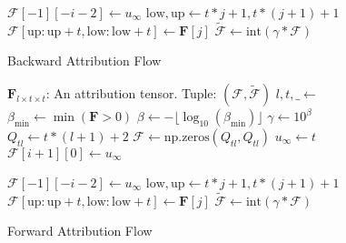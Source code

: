 \documentclass{article} %
\theoremstyle{bfnote}
\newcommand{\adddetail}[2]{\todo[inline, inlinewidth=5cm, author=#2, color=lightpurple]{#1}}
\begin{document}
\begin{figure}[!htbp]
\begin{minipage}{0.45\textwidth}
\begin{algorithm}[H]
\begin{algorithmic}[0]
				\State $\mathcal{F}[-1][-i-2] \gets u_{\infty}$
				\EndFor
				\State $\text{low}, \text{up} \gets t \ast j + 1, t \ast (j + 1) + 1$
				\State $\mathcal{F}[\text{up} : \text{up}+t, \text{low} : \text{low}+t] \gets \bm{F}[j]$
				\EndFor
				\State $\widetilde{\mathcal{F}} \gets\text{int}(\gamma \ast \mathcal{F})$
				\EndFunction
			\end{algorithmic}
			\caption{Backward Attribution Flow}\label{algo:1}
		\end{algorithm}
	\end{minipage}
	\hfill
	\begin{minipage}{0.45\textwidth}
		\begin{algorithm}[H]
			\footnotesize
			\begin{algorithmic}[0]
				\Require $\bm{F}_{l\times t \times t}$: An attribution tensor.
				\Ensure Tuple: $(\mathcal{F}, \widetilde{\mathcal{F}})$
				\State $l, t, \text{$\_$} \gets$ 
				\State $\text{$\beta_{\min}$} \gets \min(\bm{F}>0)$
				\State $\text{$\beta$} \gets -\lfloor \log_{10}(\text{$\beta_{\min}$}) \rfloor$
				\State $\gamma \gets 10^\beta$
				\State $Q_{tl} \gets t \ast (l + 1) + 2$
				\State $\mathcal{\mathcal{F}} \gets \text{np.zeros} (Q_{tl}, Q_{tl})$
				\State $u_{\infty} \gets t$
				\State $\mathcal{F}[i+1][0] \gets u_{\infty}$
				\EndFor
				
				\State $\mathcal{F}[-1][-i-2] \gets u_{\infty}$
				\EndFor
				\State $\text{low}, \text{up} \gets t \ast j + 1, t \ast (j + 1) + 1$
				\State $\mathcal{F}[\text{up} : \text{up}+t, \text{low} : \text{low}+t] \gets \bm{F}[j]$
				\EndFor
				\State $\widetilde{\mathcal{F}} \gets\text{int}(\gamma \ast \mathcal{F})$
				\EndFunction
			\end{algorithmic}
			\caption{Forward Attribution Flow}\label{algo:2}
		\end{algorithm}
	\end{minipage}

\end{figure}

\end{document}
